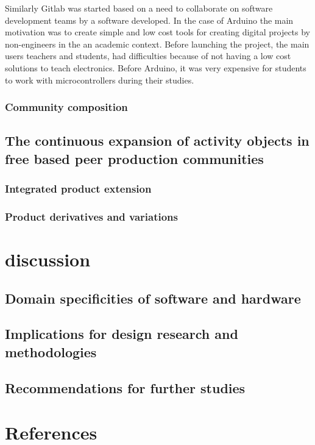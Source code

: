\documentclass{ICED-Paper}%
\begin{document}
Similarly Gitlab was started based on a need to collaborate on software development teams by a software developed. In the case of Arduino the main motivation was to create simple and low cost tools for creating digital projects by non-engineers in the an academic context. Before launching the project, the main users teachers and students, had difficulties because of not having a low cost solutions to teach electronics. Before Arduino, it was very expensive for students to work with microcontrollers during their studies.


\subsubsection{Community composition}

\subsection{The continuous expansion of activity objects in free based peer production communities}

\subsubsection{Integrated product extension}

\subsubsection{Product derivatives and variations}

\section{discussion}
\subsection{Domain specificities of software and hardware}

\subsection{Implications for design research and methodologies}

\subsection{Recommendations for further studies}

\section*{References}
\end{document}
